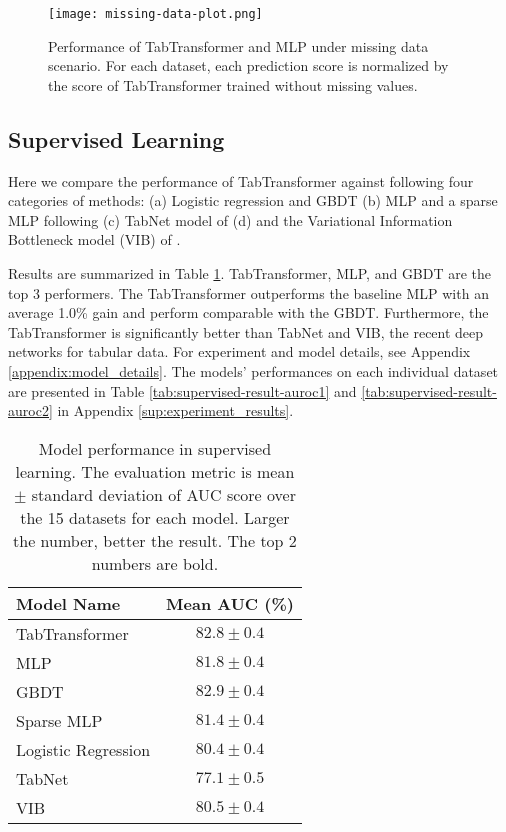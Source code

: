 \begin{figure}[h]
\centering
\texttt{[image: missing-data-plot.png]} %
\caption{Performance of TabTransformer and MLP under missing data scenario. For each dataset, each prediction score is normalized by the score of TabTransformer trained without missing values. 
}
\label{fig:missing}
\end{figure}

\subsection{Supervised Learning}\label{subsec: supervised-learning}

Here we compare the performance of TabTransformer against following four categories of methods: (a) Logistic regression and GBDT (b) MLP and a sparse MLP following \cite{morcos_one_2019} (c) TabNet model of \citet{arik2019tabnet} (d) and the Variational Information Bottleneck model (VIB) of \citet{alemi_deep_2016}. 

Results are summarized in Table \ref{tab:supervised_result}. TabTransformer, MLP, and GBDT are the top 3 performers. The TabTransformer outperforms the baseline MLP with an average 1.0\% gain and perform comparable with the GBDT. Furthermore, the TabTransformer is significantly better than TabNet and VIB, the recent deep networks for tabular data. For experiment and model details, see Appendix \ref{appendix:model_details}. The models' performances on each individual dataset are presented in Table \ref{tab:supervised-result-auroc1} and \ref{tab:supervised-result-auroc2} in Appendix \ref{sup:experiment_results}. 

\begin{table}
\caption{Model performance in supervised learning. The evaluation metric is mean $\pm$ standard deviation of AUC score over the 15 datasets for each model.
Larger the number, better the result. The top 2 numbers are bold. %
}
\centering
\label{tab:supervised_result}
\setlength{\tabcolsep}{4pt}
\begin{tabular}{lc}
\toprule
Model Name  & Mean AUC (\%) \\
\midrule
TabTransformer & $\mathbf{82.8} \pm 0.4$ \\
MLP & $81.8 \pm 0.4$ \\
GBDT & $\mathbf{82.9}  \pm 0.4$\\
Sparse MLP & $81.4 \pm 0.4$ \\
Logistic Regression & $ 80.4 \pm 0.4$ \\
TabNet & $77.1 \pm 0.5 $ \\
VIB & $80.5 \pm 0.4 $ \\
\bottomrule
\end{tabular}
\end{table}

